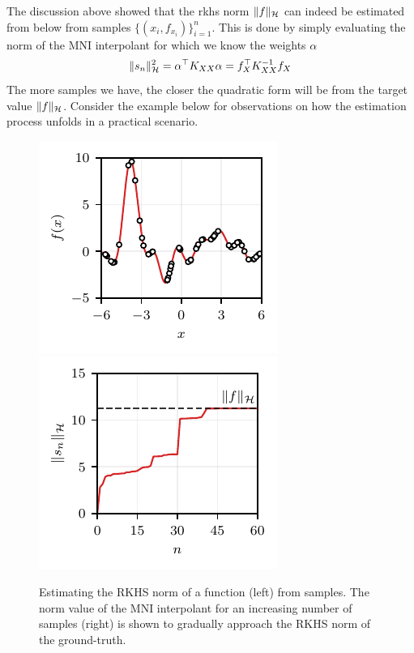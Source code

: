 The discussion above showed that the \ac{rkhs} norm $\Vert f \Vert_{\mathcal{H}}$ can indeed be estimated from below from samples $\{(x_i,f_{x_i})\}_{i=1}^n$. This is done by simply evaluating the norm of the MNI interpolant for which we know the weights $\alpha$
\begin{equation}
\Vert s_n \Vert_{\mathcal{H}}^2 = \alpha^\top K_{XX} \alpha = f_{X}^\top K_{XX}^{-1} f_{X}
\end{equation}
The more samples we have, the closer the quadratic form will be from the target value $\Vert f \Vert_{\mathcal{H}}$. Consider the example below for observations on how the estimation process unfolds in a practical scenario.

\begin{figure}[b]
	\centering
	\includegraphics[scale=1]{../images/norm_est.pdf} 
	\includegraphics[scale=1]{../images/norm_value.pdf} %
	\caption{Estimating the RKHS norm of a function (left) from samples. The norm value of the MNI interpolant for an increasing number of samples (right) is shown to gradually approach the RKHS norm of the ground-truth.}
	\label{fig.appendice_norm_estimation}
\end{figure}

